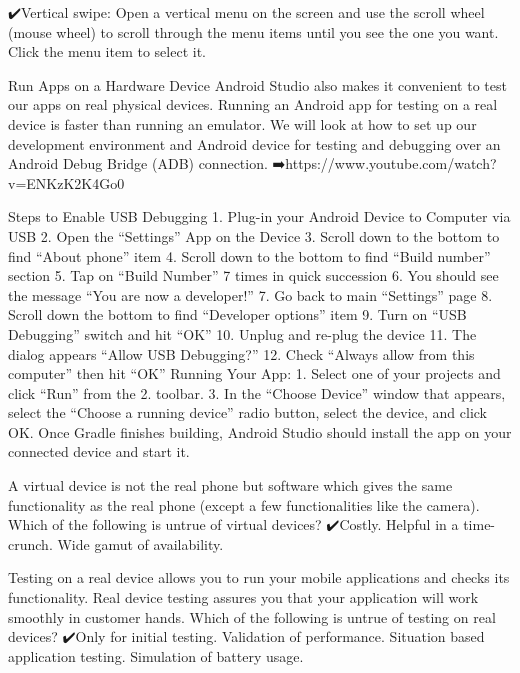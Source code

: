         ✔️Vertical swipe: Open a vertical menu on the screen and use the scroll wheel (mouse wheel) to scroll through the menu items until you see the one you want. Click the menu item to select it.

    Run Apps on a Hardware Device
        Android Studio also makes it convenient to test our apps on real physical devices. Running an Android app for testing on a real device is faster than running an emulator. We will look at how to set up our development environment and Android device for testing and debugging over an Android Debug Bridge (ADB) connection.
            ➡️https://www.youtube.com/watch?v=ENKzK2K4Go0

    Steps to Enable USB Debugging
        1. Plug-in your Android Device to Computer via USB
        2. Open the “Settings” App on the Device
        3. Scroll down to the bottom to find “About phone” item
        4. Scroll down to the bottom to find “Build number” section
        5. Tap on “Build Number” 7 times in quick succession
        6. You should see the message “You are now a developer!”
        7. Go back to main “Settings” page
        8. Scroll down the bottom to find “Developer options” item
        9. Turn on “USB Debugging” switch and hit “OK”
        10. Unplug and re-plug the device
        11. The dialog appears “Allow USB Debugging?”
        12. Check “Always allow from this computer” then hit “OK”
    Running Your App:
        1. Select one of your projects and click “Run” from the 2. toolbar.
        3. In the “Choose Device” window that appears, select the “Choose a running device” radio button, select the device, and click OK.
        Once Gradle finishes building, Android Studio should install the app on your connected device and start it.
        
        A virtual device is not the real phone but software which gives the same functionality as the real phone (except a few functionalities like the camera). Which of the following is untrue of virtual devices?
            ✔️Costly.
            Helpful in a time-crunch.
            Wide gamut of availability.
        
        Testing on a real device allows you to run your mobile applications and checks its functionality. Real device testing assures you that your application will work smoothly in customer hands. Which of the following is untrue of testing on real devices?
            ✔️Only for initial testing.
            Validation of performance.
            Situation based application testing.
            Simulation of battery usage.
